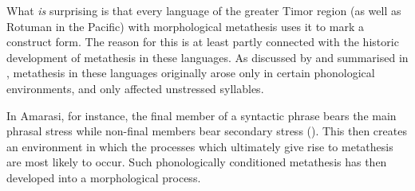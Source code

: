 What \emph{is} surprising is that every language of the greater Timor
region (as well as Rotuman in the Pacific)
with morphological metathesis uses it to mark a construct form.
The reason for this is at least partly connected with the historic development
of metathesis in these languages.
As discussed by \cite{blga98} and summarised in ,
metathesis in these languages originally
arose only in certain phonological environments,
and only affected unstressed syllables.

In Amarasi, for instance, the final member of a syntactic
phrase bears the main phrasal stress
while non-final members bear secondary stress  ().
This then creates an environment in
which the processes which ultimately give rise to metathesis are most likely to occur.
Such phonologically conditioned metathesis has then developed into a morphological process.


